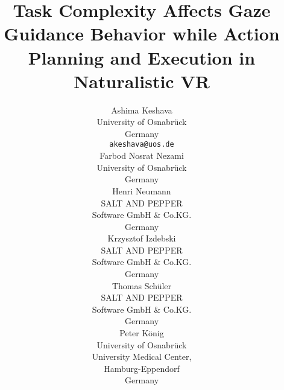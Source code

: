 \documentclass{article}
\begin{document}
\title{Task Complexity Affects Gaze Guidance Behavior while Action Planning and Execution in Naturalistic VR}
\author{
  Ashima Keshava\\
  University of Osnabr{\"u}ck\\
  Germany\\
  \texttt{akeshava@uos.de} \\
   \And
   Farbod Nosrat Nezami\\
  University of Osnabr{\"u}ck\\
  Germany
  
   \And
   Henri Neumann\\
  SALT AND PEPPER \\ Software GmbH \& Co.KG.\\
  Germany\\
   \And
  Krzysztof Izdebski\\
  SALT AND PEPPER \\ Software GmbH \& Co.KG.\\
  Germany\\
   \And
   Thomas Sch{\"u}ler\\
  SALT AND PEPPER \\ Software GmbH \& Co.KG.\\
  Germany\\
   \And
   Peter K{\"o}nig\\
   University of Osnabr{\"u}ck\\
   University Medical Center,\\ Hamburg-Eppendorf\\
   Germany
}

\maketitle

\begin{abstract}

\end{abstract}


\linenumbers
\captionsetup[figure]{font=scriptsize,labelfont=bf}






% 
\end{document}

